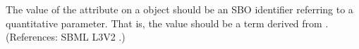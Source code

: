 The value of the attribute  on a \LocalParameter object should be
an SBO identifier referring to a quantitative parameter.  That is, the
value should be a term derived from \sboparameter.  (References: SBML
 L3V2 .)
